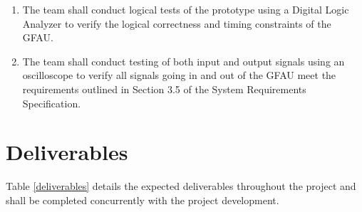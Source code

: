 \documentclass[12pt]{extarticle}
\begin{document}
            \begin{enumerate}[label=\textbf{\thesubsubsection.\arabic*.},
            leftmargin=6em]
                \item The team shall conduct logical tests of the prototype
                using a Digital Logic Analyzer to verify the logical
                correctness and timing constraints of the GFAU.
                \item The team shall conduct testing of both input and output
                signals using an oscilloscope to verify all signals going in
                and out of the GFAU meet the requirements outlined in Section
                3.5 of the System Requirements Specification.
            \end{enumerate}

    \newpage
    \section{Deliverables} Table \ref{deliverables} details the expected
    deliverables throughout the project and shall be completed concurrently
    with the project development.
\end{document}
